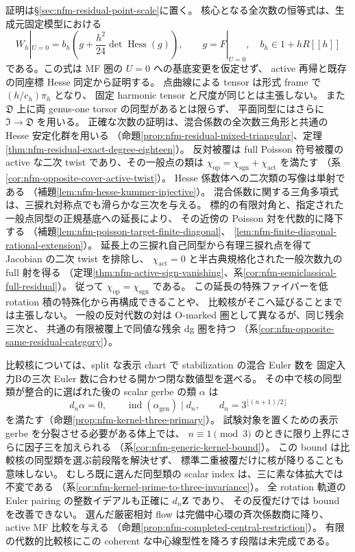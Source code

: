 \documentclass[11pt,a4paper]{ltjsarticle}
\numberwithin{equation}{section}
\begin{document}
証明は\S\ref{sec:nfm-residual-point-scale}に置く。
核心となる全次数の恒等式は、生成元固定模型における
\[
 W_h|_{U=0}=b_h\left(g+\frac{h^2}{24}\det\operatorname{Hess}(g)\right),
 \qquad g=F|_{U=0},\quad b_h\in1+hR[[h]]
\]
である。この式は MF 圏の $U=0$ への基底変更を仮定せず、
active 再帰と既存の同座標 Hesse 同定から証明する。
点曲線による tensor は形式 frame で $(h/c_h)\pi_h$ となり、
固定 harmonic tensor と尺度が同じとは主張しない。
また $\mathfrak D$ 上に両 genus-one torsor の同型があるとは限らず、
平面同型にはさらに $\mathfrak I\to\mathfrak D$ を用いる。
正確な次数の証明は、混合係数の全次数三角形と共通の Hesse 安定化群を用いる
（命題\ref{prop:nfm-residual-mixed-triangular}、定理\ref{thm:nfm-residual-exact-degree-eighteen}）。
反対被覆は full Poisson 符号被覆の active な二次 twist であり、その一般点の類は
$\chi_{\mathrm{op}}=\chi_{\mathrm{sgn}}+\chi_{\mathrm{act}}$ を満たす
（系\ref{cor:nfm-opposite-cover-active-twist}）。
Hesse 係数体への二次類の写像は単射である
（補題\ref{lem:nfm-hesse-kummer-injective}）。
混合係数に関する三角多項式は、三捩れ対称点でも滑らかな三次を与える。
標的の有限対角と、指定された一般点同型の正規基底への延長により、
その近傍の Poisson 対を代数的に降下する
（補題\ref{lem:nfm-poisson-target-finite-diagonal}、
\ref{lem:nfm-finite-diagonal-rational-extension}）。
延長上の三捩れ自己同型から有理三捩れ点を得て Jacobian の二次 twist を排除し、
$\chi_{\mathrm{act}}=0$ と半古典規格化された一般次数九の full 射を得る
（定理\ref{thm:nfm-active-sign-vanishing}、系\ref{cor:nfm-semiclassical-full-residual}）。
従って $\chi_{\mathrm{op}}=\chi_{\mathrm{sgn}}$ である。
この延長の特殊ファイバーを低 rotation 積の特殊化から再構成できることや、
比較核がそこへ延びることまでは主張しない。
一般の反対代数の対は O-marked 圏として異なるが、同じ残余三次と、
共通の有限被覆上で同値な残余 dg 圏を持つ
（系\ref{cor:nfm-opposite-same-residual-category}）。

比較核については、split な表示 chart で stabilization の混合 Euler 数を
固定入力Bの三次 Euler 数に合わせる開かつ閉な数値型を選べる。
その中で核の同型類が整合的に選ばれた後の scalar gerbe の類 $\alpha$ は
\[
 d_n\alpha=0,\qquad
 \operatorname{ind}(\alpha_{\mathrm{gen}})\mid d_n,
 \qquad d_n=3^{\lfloor(n+1)/2\rfloor}
\]
を満たす（命題\ref{prop:nfm-kernel-three-primary}）。
試験対象を置くための表示 gerbe を分裂させる必要がある体上では、
$n\equiv1\pmod3$ のときに限り上界にさらに因子三を加えられる
（系\ref{cor:nfm-generic-kernel-bound}）。
この bound は比較核の同型類を選ぶ前段階を解決せず、
標準二重被覆だけに核が降りることも意味しない。
むしろ既に選んだ同型類の scalar index は、三に素な体拡大では不変である
（系\ref{cor:nfm-kernel-prime-to-three-invariance}）。
全 rotation 軌道の Euler pairing の整数イデアルも正確に $d_n\mathbf Z$ であり、
その反復だけでは bound を改善できない。
選んだ厳密相対 flow は完備中心環の斉次係数商に降り、active MF 比較を与える
（命題\ref{prop:nfm-completed-central-restriction}）。
有限の代数的比較核にこの coherent な中心線型性を降ろす段階は未完成である。
\end{document}
